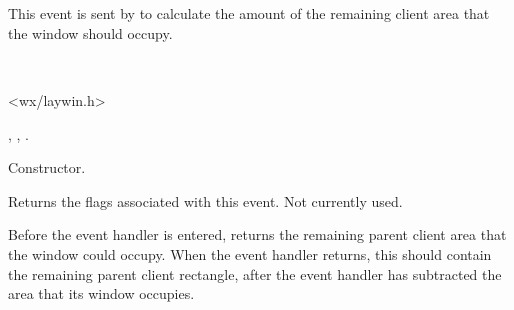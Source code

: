 \section{}\label{wxcalculatelayoutevent}

This event is sent by  to
calculate the amount of the remaining client area that the window should
occupy.


\\


<wx/laywin.h>


\twocolwidtha{7cm}%
\begin{twocollist}\itemsep=0pt
\end{twocollist}


,\rtfsp
{},\rtfsp
{}.


\label{wxcalculatelayouteventctor}


Constructor.

\label{wxcalculatelayouteventgetflags}


Returns the flags associated with this event. Not currently used.

\label{wxcalculatelayouteventgetrect}


Before the event handler is entered, returns the remaining parent client area that the window
could occupy. When the event handler returns, this should contain the remaining parent client rectangle,
after the event handler has subtracted the area that its window occupies.

